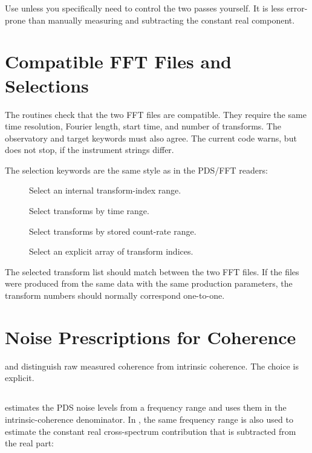 \begin{ghatsnote}
Use  unless you specifically need to control the two passes
yourself.  It is less error-prone than manually measuring and subtracting the
constant real component.
\end{ghatsnote}

\section{Compatible FFT Files and Selections}

The routines check that the two FFT files are compatible.  They require the
same time resolution, Fourier length, start time, and number of transforms.
The observatory and target keywords must also agree.  The current
 code warns, but does not stop, if the
instrument strings differ.

The selection keywords are the same style as in the PDS/FFT readers:

\begin{description}
\item[] Select an internal transform-index range.
\item[] Select transforms by time range.
\item[] Select transforms by stored count-rate range.
\item[] Select an explicit array of transform indices.
\end{description}

The selected transform list should match between the two FFT files.  If the
files were produced from the same data with the same production parameters,
the transform numbers should normally correspond one-to-one.

\section{Noise Prescriptions for Coherence}

 and  distinguish raw measured
coherence from intrinsic coherence.  The choice is explicit.

\subsection{}

 estimates the PDS noise levels from a frequency range
and uses them in the intrinsic-coherence denominator.  In ,
the same frequency range is also used to estimate the constant real
cross-spectrum contribution that is subtracted from the real part:

